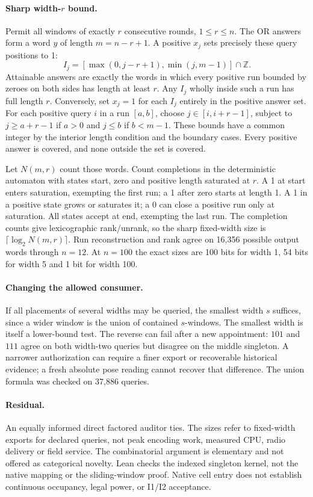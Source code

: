 \documentclass{article}
\begin{document}
\paragraph{Sharp width-$r$ bound.}
Permit all windows of exactly $r$ consecutive rounds, $1\le r\le n$.
The OR answers form a word $y$ of length $m=n-r+1$. A positive $x_j$
sets precisely these query positions to 1:
\[
I_j=[\max(0,j-r+1),\min(j,m-1)]\cap\mathbb{Z}.
\]
Attainable answers are exactly the words in which every positive run
bounded by zeroes on both sides has length at least $r$. Any $I_j$
wholly inside such a run has full length $r$. Conversely, set $x_j=1$
for each $I_j$ entirely in the positive answer set. For each positive
query $i$ in a run $[a,b]$, choose $j\in[i,i+r-1]$, subject to
$j\ge a+r-1$ if $a>0$ and $j\le b$ if $b<m-1$. These bounds have a
common integer by the interior length condition and the boundary cases.
Every positive answer is covered, and none outside the set is covered.

Let $N(m,r)$ count those words. Count completions in the deterministic
automaton with states start, zero and positive length saturated at $r$.
A 1 at start enters saturation, exempting the first run; a 1 after zero
starts at length 1. A 1 in a positive state grows or saturates it;
a 0 can close a positive run only at saturation. All states accept at
end, exempting the last run. The completion counts give lexicographic
rank/unrank, so the sharp fixed-width size is $\lceil\log_2 N(m,r)\rceil$.
Run reconstruction and rank agree on 16,356 possible output words
through $n=12$. At $n=100$ the exact sizes are 100 bits for width 1,
54 bits for width 5 and 1 bit for width 100.

\paragraph{Changing the allowed consumer.}
If all placements of several widths may be queried, the smallest width
$s$ suffices, since a wider window is the union of contained $s$-windows.
The smallest width is itself a lower-bound test. The reverse can fail
after a new appointment: $101$ and $111$ agree on both width-two queries
but disagree on the middle singleton. A narrower authorization can
require a finer export or recoverable historical evidence; a fresh
absolute pose reading cannot recover that difference. The union formula
was checked on 37,886 queries.

\paragraph{Residual.}
An equally informed direct factored auditor ties. The sizes refer to
fixed-width exports for declared queries, not peak encoding work,
measured CPU, radio delivery or field service. The combinatorial
argument is elementary and not offered as categorical novelty. Lean
checks the indexed singleton kernel, not the native mapping or the
sliding-window proof. Native cell entry does not establish continuous
occupancy, legal power, or I1/I2 acceptance.
\end{document}
